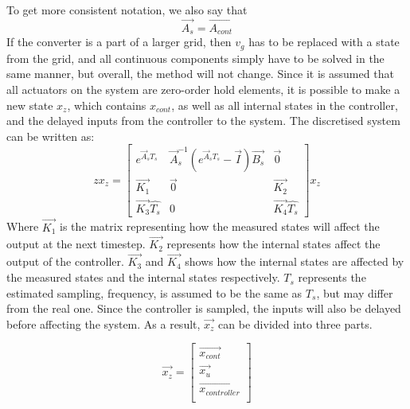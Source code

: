 To get more consistent notation, we also say that
\begin{equation}
 \Vec{A_s} = \Vec{A_{cont}}
\end{equation}
If the converter is a part of a larger grid, then $v_g$ has to be replaced with a state from the grid, and all continuous components simply have to be solved in the same manner, but overall, the method will not change. Since it is assumed that all actuators on the system are zero-order hold elements, it is possible to make a new state $x_z$, which contains $x_{cont}$, as well as all internal states in the controller, and the delayed inputs from the controller to the system. The discretised system can be written as: 
\begin{equation}
 z {x}_z = 
 \begin{bmatrix}
 e^{\Vec{A}_s T_s} & \Vec{A}_s^{-1}( e^{\Vec{A}_s T_s} - \Vec{I}) \Vec{B_s} & \Vec{0}\\
 \Vec{K_1} & \Vec{0} & \Vec{K_2} \\
 \Vec{K_3} \hat{T_s} & 0 & \Vec{K_4} \hat{T_s}
 \end{bmatrix}{}
 x_z
 \label{eq:A_z}
\end{equation}{}
Where $\Vec{K_1}$ is the matrix representing how the measured states will affect the output at the next timestep. $\Vec{K_2}$ represents how the internal states affect the output of the controller. $\Vec{K_3}$ and $\Vec{K_4}$ shows how the internal states are affected by the measured states and the internal states respectively. $\hat{T_s}$ represents the estimated sampling, frequency, is assumed to be the same as $T_s$, but may differ from the real one. Since the controller is sampled, the inputs will also be delayed before affecting the system. As a result, $\Vec{x_z}$ can be divided into three parts. 

\begin{equation}
 \Vec{x_z} = 
\begin{bmatrix}
 \Vec{x_{cont}} \\
 \Vec{x_{u}} \\
 \Vec{x_{controller}} \\
\end{bmatrix}{}
\end{equation}{}

